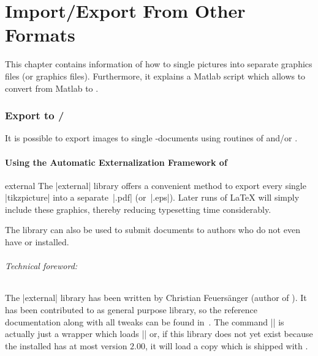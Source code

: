 
\part[importexport]{Import/Export From Other Formats}
\label{cha:pgfplots:importexport}

{

This chapter contains information of how to single pictures into separate
\pdf{} graphics files (or \eps{} graphics files). Furthermore, it explains a
Matlab\textregistered{} script which allows to convert from Matlab to
\PGFPlots{}.


\section[export-pdf-eps]{Export to {\normalfont\pdf{}/\eps{}}}
\label{sec:pgfplots:export}

It is possible to export images to single \pdf{}-documents using routines of
\pgfname{} and/or \Tikz{}.


\subsection{Using the Automatic Externalization Framework of \Tikz}

\begin{pgfplotslibrary}{external}
    The |external| library offers a convenient method to export every single
    |tikzpicture| into a separate~|.pdf| (or~|.eps|). Later runs of \LaTeX{}
    will simply include these graphics, thereby reducing typesetting time
    considerably.

    The library can also be used to submit documents to authors who do not even
    have \PGFPlots{} or \Tikz{} installed.


    \paragraph{Technical foreword:}

    The |external| library has been written by Christian Feuersänger (author
    of \PGFPlots). It has been contributed to \Tikz{} as general purpose
    library, so the reference documentation along with all tweaks can be found
    in~\cite[Section ``Externalization Library'']{tikz}. The command
    || is actually just a wrapper which loads
    |\usetikzlibrary{external}| or, if this library does not yet exist because
    the installed \pgfname{} has at most version $2.00$, it will load a copy
    which is shipped with \PGFPlots{}.


\end{pgfplotslibrary}}
